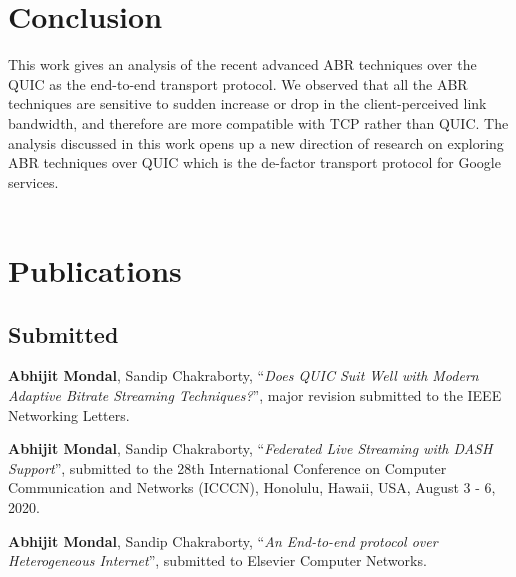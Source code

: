 \section{Conclusion}
This work gives an analysis of the recent advanced ABR techniques over the QUIC as the end-to-end transport protocol. We observed that all the ABR techniques are sensitive to sudden increase or drop in the client-perceived link bandwidth, and therefore are more compatible with TCP rather than QUIC.  The analysis discussed in this work opens up a new direction of research on exploring ABR techniques over QUIC which is the de-factor transport protocol for Google services. 
\\
\\
\section*{Publications}

\subsection*{Submitted}
\begin{enumerate}[start=1,label={[\arabic*]}]
	\item \textbf{Abhijit Mondal}, Sandip Chakraborty, ``\textit{Does QUIC Suit Well with Modern Adaptive Bitrate Streaming Techniques?}'', major revision submitted to the IEEE Networking Letters.
	\item \textbf{Abhijit Mondal}, Sandip Chakraborty, ``\textit{Federated Live Streaming with DASH Support}'', submitted to the 28th International Conference on Computer Communication and Networks (ICCCN), Honolulu, Hawaii, USA, August 3 - 6, 2020.
	\item \textbf{Abhijit Mondal}, Sandip Chakraborty, ``\textit{An End-to-end protocol over Heterogeneous Internet}'', submitted to Elsevier Computer Networks.
\end{enumerate}


